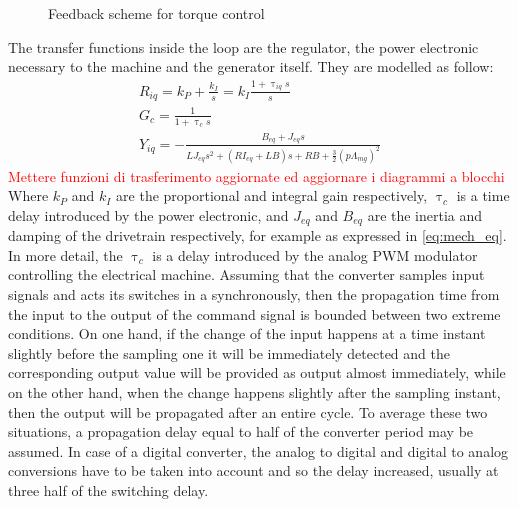 \begin{figure}[htb]
    \centering
    
    \caption{Feedback scheme for torque control}
    \label{fig:d_torque_control}
\end{figure}

The transfer functions inside the loop are the regulator, the power electronic necessary to the machine and the generator itself. They are modelled as follow:
\begin{gather}
    R_{iq}=k_P + \frac{k_I}{s}=k_I\frac{1+\uptau_{iq}s}{s}
    \label{eq:R_iq}\\
    G_c = \frac{1}{1+\uptau_cs}
    \label{eq:G_c}\\
    Y_{iq} = -\frac{B_{eq} + J_{eq}s}{LJ_{eq}s^2+\left(RI_{eq} + L B\right)s + RB + \frac{3}{2}(p\Lambda_{mg})^2}
    \label{eq:Y_iq}
\end{gather}
\textcolor{red}{Mettere funzioni di trasferimento aggiornate ed aggiornare i diagrammi a blocchi}\\
Where $k_P$ and $k_I$ are the proportional and integral gain respectively, $\uptau_c$ is a time delay introduced by the power electronic, and $J_{eq}$ and $B_{eq}$ are the inertia and damping of the drivetrain respectively, for example as expressed in \autoref{eq:mech_eq}.\\
In more detail, the $\uptau_c$ is a delay introduced by the analog PWM modulator controlling the electrical machine. Assuming that the converter samples input signals and acts its switches in a synchronously, then the propagation time from the input to the output of the command signal is bounded between two extreme conditions. On one hand, if the change of the input happens at a time instant slightly before the sampling one it will be immediately detected and the corresponding output value will be provided as output almost immediately, while on the other hand, when the change happens slightly after the sampling instant, then the output will be propagated after an entire cycle. To average these two situations, a propagation delay equal to half of the converter period may be assumed. In case of a digital converter, the analog to digital and digital to analog conversions have to be taken into account and so the delay increased, usually at three half of the switching delay.
